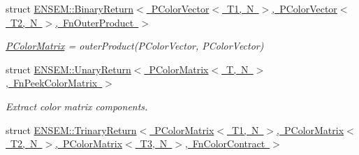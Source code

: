 \begin{DoxyCompactItemize}
\item 
struct \mbox{\hyperlink{structENSEM_1_1BinaryReturn_3_01PColorVector_3_01T1_00_01N_01_4_00_01PColorVector_3_01T2_00_01N_01_4_00_01FnOuterProduct_01_4}{E\+N\+S\+E\+M\+::\+Binary\+Return$<$ P\+Color\+Vector$<$ T1, N $>$, P\+Color\+Vector$<$ T2, N $>$, Fn\+Outer\+Product $>$}}
\begin{DoxyCompactList}\small\item\em \mbox{\hyperlink{classENSEM_1_1PColorMatrix}{P\+Color\+Matrix}} = outer\+Product(\+P\+Color\+Vector, P\+Color\+Vector) \end{DoxyCompactList}\item 
struct \mbox{\hyperlink{structENSEM_1_1UnaryReturn_3_01PColorMatrix_3_01T_00_01N_01_4_00_01FnPeekColorMatrix_01_4}{E\+N\+S\+E\+M\+::\+Unary\+Return$<$ P\+Color\+Matrix$<$ T, N $>$, Fn\+Peek\+Color\+Matrix $>$}}
\begin{DoxyCompactList}\small\item\em Extract color matrix components. \end{DoxyCompactList}\item 
struct \mbox{\hyperlink{structENSEM_1_1TrinaryReturn_3_01PColorMatrix_3_01T1_00_01N_01_4_00_01PColorMatrix_3_01T2_00_01N1d3d49ae4a9604208f2204d046c31000}{E\+N\+S\+E\+M\+::\+Trinary\+Return$<$ P\+Color\+Matrix$<$ T1, N $>$, P\+Color\+Matrix$<$ T2, N $>$, P\+Color\+Matrix$<$ T3, N $>$, Fn\+Color\+Contract $>$}}
\end{DoxyCompactItemize}
